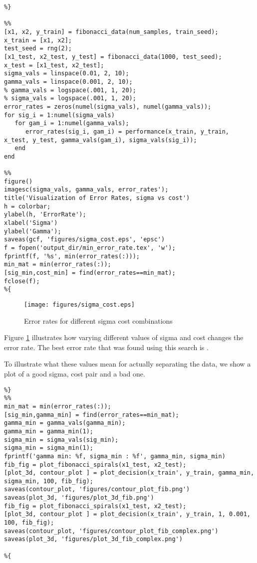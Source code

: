 \documentclass[11pt, twoside]{article}   	%
\begin{document}
\begin{lstlisting}
%}

%%
[x1, x2, y_train] = fibonacci_data(num_samples, train_seed);
x_train = [x1, x2];
test_seed = rng(2); 
[x1_test, x2_test, y_test] = fibonacci_data(1000, test_seed);
x_test = [x1_test, x2_test];
sigma_vals = linspace(0.01, 2, 10); 
gamma_vals = linspace(0.001, 2, 10);
% gamma_vals = logspace(.001, 1, 20);
% sigma_vals = logspace(.001, 1, 20); 
error_rates = zeros(numel(sigma_vals), numel(gamma_vals)); 
for sig_i = 1:numel(sigma_vals)
   for gam_i = 1:numel(gamma_vals); 
      error_rates(sig_i, gam_i) = performance(x_train, y_train, x_test, y_test, gamma_vals(gam_i), sigma_vals(sig_i)); 
   end
end

%%
figure()
imagesc(sigma_vals, gamma_vals, error_rates');
title('Visualization of Error Rates, sigma vs cost')
h = colorbar;
ylabel(h, 'ErrorRate');
xlabel('Sigma')
ylabel('Gamma'); 
saveas(gcf, 'figures/sigma_cost.eps', 'epsc')
f = fopen('output_dir/min_error_rate.tex', 'w'); 
fprintf(f, '%s', min(error_rates(:))); 
min_mat = min(error_rates(:));
[sig_min,cost_min] = find(error_rates==min_mat);
fclose(f);
%{
\end{lstlisting}

\begin{figure}[h]
\centering
\texttt{[image: figures/sigma\_cost.eps]}
\caption{Error rates for different sigma cost combinations}
\label{fig:sigma_cost} 
\end{figure}

Figure \ref{fig:sigma_cost} illustrates how varying different values of
sigma and cost changes the error rate. The best error rate that was found
using this search is .

To illustrate what these values mean for actually separating the data, we
show a plot of a good sigma, cost pair and a bad one. 

\begin{lstlisting}
%}
%%
min_mat = min(error_rates(:));
[sig_min,gamma_min] = find(error_rates==min_mat);
gamma_min = gamma_vals(gamma_min);
gamma_min = gamma_min(1); 
sigma_min = sigma_vals(sig_min);
sigma_min = sigma_min(1); 
fprintf('gamma min: %f, sigma_min : %f', gamma_min, sigma_min)
fib_fig = plot_fibonacci_spirals(x1_test, x2_test); 
[plot_3d, contour_plot ] = plot_decision(x_train', y_train, gamma_min, sigma_min, 100, fib_fig);
saveas(contour_plot, 'figures/contour_plot_fib.png')
saveas(plot_3d, 'figures/plot_3d_fib.png')
fib_fig = plot_fibonacci_spirals(x1_test, x2_test);
[plot_3d, contour_plot ] = plot_decision(x_train', y_train, 1, 0.001, 100, fib_fig);
saveas(contour_plot, 'figures/contour_plot_fib_complex.png')
saveas(plot_3d, 'figures/plot_3d_fib_complex.png')

%{
\end{lstlisting}
\end{document}
